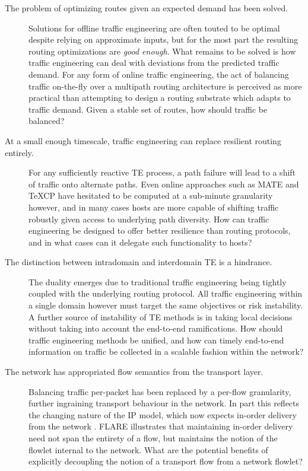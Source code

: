 \renewcommand{\descriptionlabel}[1]{\hspace{\labelsep}\textbf{#1}}
\begin{description}
\item[The problem of optimizing routes given an expected demand has been solved.]{
    Solutions for offline traffic engineering \cite{Fortz:2000p350,YufeiWang:1999p222,Wang:2001p506} are often touted to be optimal despite relying on approximate inputs, but for the most part the resulting routing optimizations are \emph{good enough}. 
    What remains to be solved is how traffic engineering can deal with deviations from the predicted traffic demand.
    For any form of online traffic engineering, the act of balancing traffic on-the-fly over a multipath routing architecture is perceived as more practical than attempting to design a routing substrate which adapts to traffic demand.
    Given a stable set of routes, how should traffic be balanced?
}

\item[At a small enough timescale, traffic engineering can replace resilient routing entirely.]{
    For any sufficiently reactive \ac{TE} process, a path failure will lead to a shift of traffic onto alternate paths. 
    Even online approaches such as \ac{MATE} \cite{Elwalid:2002p153} and \ac{TeXCP} \cite{Kandula:2005p90} have hesitated to be computed at a sub-minute granularity however, and in many cases hosts are more capable of shifting traffic robustly given access to underlying path diversity.
    How can traffic engineering be designed to offer better resilience than routing protocols, and in what cases can it delegate such functionality to hosts?
}

\item[The distinction between intradomain and interdomain \ac{TE} is a hindrance.]{
    The duality emerges due to traditional traffic engineering being tightly coupled with the underlying routing protocol.
    All traffic engineering within a single domain however must target the same objectives or risk instability.
    A further source of instability of \ac{TE} methods is in taking local decisions without taking into account the end-to-end ramifications.
    How should traffic engineering methods be unified, and how can timely end-to-end information on traffic be collected in a scalable fashion within the network?
}

\item[The network has appropriated flow semantics from the transport layer.]{
    Balancing traffic per-packet has been replaced by a per-flow granularity, further ingraining transport behaviour in the network.
    In part this reflects the changing nature of the \ac{IP} model, which now expects in-order delivery from the network \cite{Thaler:2010p223}.
    \ac{FLARE} \cite{Sinha:2004p124} illustrates that maintaining in-order delivery need not span the entirety of a flow, but maintains the notion of the flowlet internal to the network.
    What are the potential benefits of explicitly decoupling the notion of a transport flow from a network flowlet?
}
\end{description}


